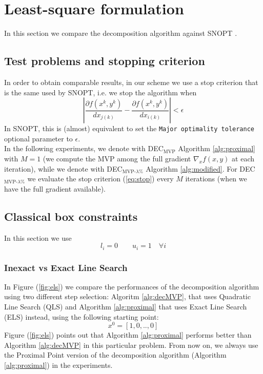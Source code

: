 \section{Least-square formulation}
In this section we compare the decomposition algorithm against SNOPT \cite{snopt}.

\subsection{Test problems and stopping criterion}
In order to obtain comparable results, in our scheme we use a stop criterion that is the same used by SNOPT, i.e. we stop the algorithm when
\begin{equation}\label{eq:stop}
\left| \frac{\partial f(x^k,y^k)}{d{x_{j(k)}}} - \frac{\partial f(x^k,y^k)}{d{x_{i(k)}} }\right| < \epsilon
\end{equation}
In SNOPT, this is (almost) equivalent to set the \texttt{Major optimality tolerance} optional parameter to $\epsilon$.\\
In the following experiments, we denote with DEC$_{\text{MVP}}$ Algorithm \ref{alg:proximal} with $M=1$ (we compute the MVP among the full gradient $\nabla_x f(x,y)$ at each iteration), while we denote with DEC$_{\text{MVP-}\lambda\%}$ Algorithm \ref{alg:modified}. For DEC$_{\text{MVP-}\lambda\%}$ we evaluate the stop criterion (\ref{eq:stop}) every $M$ iterations (when we have the full gradient available).

\subsection{Classical box constraints}
In this section we use 
\begin{equation}\label{eq:classicalbox}
l_i = 0  \qquad u_i = 1  \quad \forall i
\end{equation} 
\subsubsection{Inexact vs Exact Line Search}
In Figure (\ref{fig:els}) we compare the performances of the decomposition algorithm using two different step selection: Algoritm \ref{alg:decMVP}, that uses Quadratic Line Search (QLS) and Algorithm \ref{alg:proximal} that uses Exact Line Search (ELS) instead, using the following starting point:
\begin{equation}\label{eq:sparsestarting}
x^0 = \left[1, 0, .., 0 \right]
\end{equation}
Figure (\ref{fig:els}) points out that Algorithm \ref{alg:proximal} performs better than Algorithm \ref{alg:decMVP} in this particular problem. From now on, we always use the Proximal Point version of the decomposition algorithm (Algorithm \ref{alg:proximal}) in the experiments.

